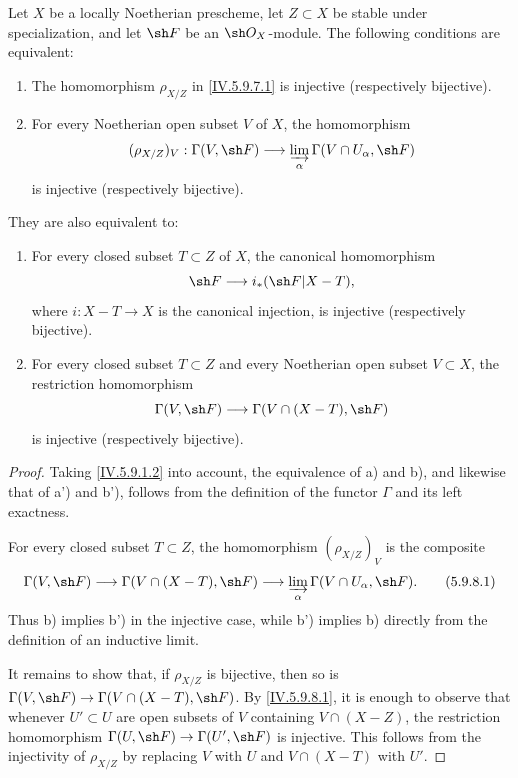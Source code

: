\begin{proposition}[5.9.8]
\label{IV.5.9.8}
Let $X$ be a locally Noetherian prescheme, let $Z\subset X$ be stable
under specialization, and let $\sh F$ be an $\sh O_X$-module.  The
following conditions are equivalent:
\begin{enumerate}[{\rm a)}]
  \item\label{IV.5.9.8.a}
    The homomorphism $\rho_{X/Z}$ in \eqref{IV.5.9.7.1} is injective
    (respectively bijective).
  \item\label{IV.5.9.8.b}
    For every Noetherian open subset $V$ of $X$, the homomorphism
    \[
      (\rho_{X/Z})_V:\Gamma(V,\sh F)\longrightarrow
      \varinjlim_\alpha\Gamma(V\cap U_\alpha,\sh F)
    \]
    is injective (respectively bijective).
\end{enumerate}
They are also equivalent to:
\begin{enumerate}
  \item[{\rm a')}] \label{IV.5.9.8.a-prime}
    For every closed subset $T\subset Z$ of $X$, the canonical
    homomorphism 
    \[
      \sh F\longrightarrow i_*(\sh F|X-T),
    \]
    where $i:X-T\to X$ is the canonical injection, is injective
    (respectively bijective).
  \item[{\rm b')}] \label{IV.5.9.8.b-prime}
    For every closed subset $T\subset Z$ and every Noetherian open
    subset $V\subset X$, the restriction homomorphism
    \[
      \Gamma(V,\sh F)\longrightarrow
      \Gamma(V\cap(X-T),\sh F)
    \]
    is injective (respectively bijective).
\end{enumerate}
\end{proposition}

\begin{proof}
Taking \eqref{IV.5.9.1.2} into account, the equivalence of a) and b),
and likewise that of a') and b'), follows from the definition of the
functor $\Gamma$ and its left exactness.

For every closed subset $T\subset Z$, the homomorphism
$(\rho_{X/Z})_V$ is the composite
\begin{equation}
\label{IV.5.9.8.1}
 \Gamma(V,\sh F)\longrightarrow
 \Gamma(V\cap(X-T),\sh F)\longrightarrow
 \varinjlim_\alpha\Gamma(V\cap U_\alpha,\sh F).
\tag{5.9.8.1}
\end{equation}
Thus b) implies b') in the injective case, while b') implies b)
directly from the definition of an inductive limit.


It remains to show that, if $\rho_{X/Z}$ is bijective, then so is
$\Gamma(V,\sh F)\to\Gamma(V\cap(X-T),\sh F)$.  By
\eqref{IV.5.9.8.1}, it is enough to observe that whenever
$U'\subset U$ are open subsets of $V$ containing $V\cap(X-Z)$, the
restriction homomorphism
$\Gamma(U,\sh F)\to\Gamma(U',\sh F)$ is injective.  This follows from
the injectivity of $\rho_{X/Z}$ by replacing $V$ with $U$ and
$V\cap(X-T)$ with $U'$.
\end{proof}

